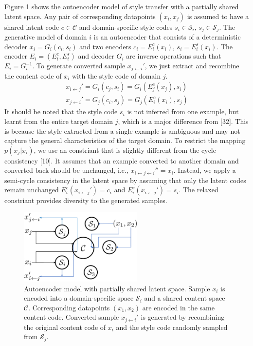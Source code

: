 \documentclass{article}
\begin{document}
Figure \ref{fig:model} shows the autoencoder model of style transfer with a partially shared latent space. Any pair of corresponding datapoints $(x_i, x_j)$ is assumed to have a shared latent code $c\in \mathcal{C}$ and domain-specific style codes $s_i\in \mathcal{S}_i$, $s_j\in \mathcal{S}_j$. The generative model of domain $i$ is an autoencoder that consists of a deterministic decoder $x_i = G_i(c_i,s_i)$ and two encoders $c_i = E_i^c(x_i)$, $s_i = E_i^s(x_i)$. The encoder $E_i = (E_i^c, E_i^s)$ and decoder $G_i$ are inverse operations such that $E_i = G_i^{-1}$. To generate converted sample $x_{j\leftarrow i}'$, we just extract and recombine the content code of $x_i$ with the style code of domain $j$.
\begin{equation}
\begin{aligned}
x_{i\leftarrow j}' = G_i(c_j, s_i) = G_i(E_j^c(x_j), s_i) \\
x_{j\leftarrow i}' = G_j(c_i, s_j) = G_j(E_i^c(x_i), s_j)
\end{aligned}
\end{equation}
It should be noted that the style code $s_i$ is not inferred from one example, but learnt from the entire target domain $j$, which is a major difference from [32]. This is because the style extracted from a single example is ambiguous and may not capture the general characteristics of the target domain. To restrict the mapping $p(x_j|x_i)$, we use an constriant that is slightly different from the cycle consistency [10]. It assumes that an example converted to another domain and converted back should be unchanged, i.e., $x_{i\leftarrow j\leftarrow i}'' = x_i$. Instead, we apply a semi-cycle consistency in the latent space by assuming that only the latent codes remain unchanged $E_i^c(x_{i\leftarrow j}') = c_i$ and $E_i^s(x_{i\leftarrow j}') = s_i$. The relaxed constriant provides diversity to the generated samples.

\begin{figure}[htb]
\center
\includegraphics[width=0.55\textwidth]{FIG/model}
\caption{Autoencoder model with partially shared latent space. Sample $x_i$ is encoded into a domain-specific space $\mathcal{S}_i$ and a shared content space $\mathcal{C}$. Corresponding datapoints $(x_1,x_2)$ are encoded in the same content code. Converted sample $x_{j\leftarrow i}'$ is generated by recombining the original content code of $x_i$ and the style code randomly sampled from $\mathcal{S}_j$.}
\label{fig:model}
\end{figure}
\end{document}
